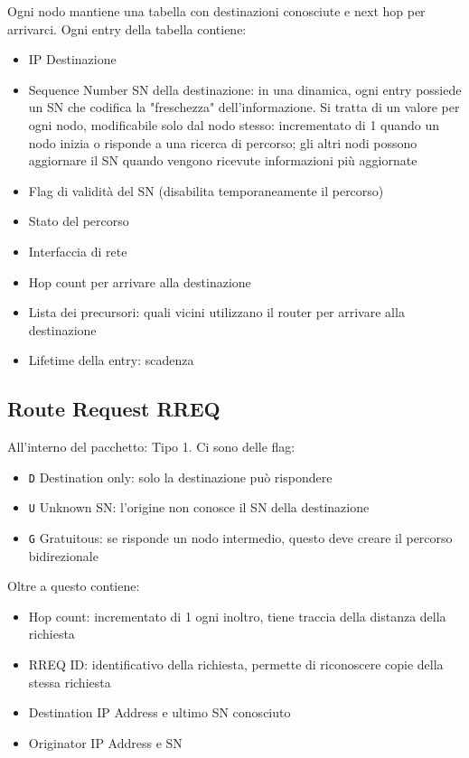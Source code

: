 Ogni nodo mantiene una tabella con destinazioni conosciute e next hop per arrivarci. Ogni entry della tabella contiene: 
\begin{itemize}
    \item IP Destinazione
    
    \item Sequence Number SN della destinazione: in una dinamica, ogni entry possiede un SN che codifica la "freschezza" dell'informazione. Si tratta di un valore per ogni nodo, modificabile solo dal nodo stesso: incrementato di 1 quando un nodo inizia o risponde a una ricerca di percorso; gli altri nodi possono aggiornare il SN quando vengono ricevute informazioni più aggiornate
    
    \item Flag di validità del SN (disabilita temporaneamente il percorso)
    
    \item Stato del percorso 
    
    \item Interfaccia di rete
    
    \item Hop count per arrivare alla destinazione
    
    \item Lista dei precursori: quali vicini utilizzano il router per arrivare alla destinazione
    
    \item Lifetime della entry: scadenza
\end{itemize}

\subsection{Route Request RREQ}

All'interno del pacchetto: Tipo 1. Ci sono delle flag: 
\begin{itemize}
    \item \texttt{D} Destination only: solo la destinazione può rispondere
    
    \item \texttt{U} Unknown SN: l'origine non conosce il SN della destinazione
    
    \item \texttt{G} Gratuitous: se risponde un nodo intermedio, questo deve creare il percorso bidirezionale
\end{itemize}

Oltre a questo contiene: 
\begin{itemize}
    \item Hop count: incrementato di 1 ogni inoltro, tiene traccia della distanza della richiesta
    
    \item RREQ ID: identificativo della richiesta, permette di riconoscere copie della stessa richiesta
    
    \item Destination IP Address e ultimo SN conosciuto
    
    \item Originator IP Address e SN
\end{itemize}

